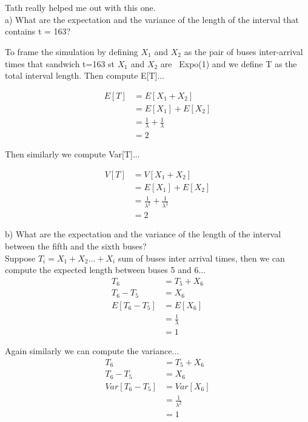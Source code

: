 \documentclass[twocolumn]{article}
\begin{document}
\noindent
{} \\\\
Tath really helped me out with this one.\\

\noindent
\mm a) What are the expectation and the variance of the length of the interval that contains t = 163?\\ \normalfont

To frame the simulation by defining $X_1$ and $X_2$ as the pair of buses inter-arrival times that sandwich t=163 st  $X_1$ and $X_2$ are ~Expo(1) and we define T as the total interval length. Then compute E[T]...

\begin{align*}
	E[T] &= E[X_1 + X_2]\\
		 &= E[X_1] + E[X_2]\\
	     &= \frac{1}{\lambda} + \frac{1}{\lambda}\\
	     &= 2
\end{align*}

Then similarly we compute Var[T]...


\begin{align*}
	V[T] &= V[X_1 + X_2]\\
	&= E[X_1] + E[X_2]\\
	&= \frac{1}{\lambda^2} + \frac{1}{\lambda^2}\\
	&= 2
\end{align*}


\noindent
\mm b)  What are the expectation and the variance of the length of the interval between the fifth and the sixth buses? \normalfont\\

Suppose $T_i = X_1 + X_2 ... + X_i$ sum of buses inter arrival times, then we can compute the expected length between buses 5 and 6...
\begin{align*}
	T_6 &= T_5 + X_6\\
	T_6 - T_5 &= X_6\\	
	E[T_6 - T_5] &= E[X_6]\\
	&= \frac{1}{\lambda}\\
	&= 1	
\end{align*}

Again similarly we can compute the variance...
\begin{align*}
	T_6 &= T_5 + X_6\\
	T_6 - T_5 &= X_6\\	
	Var[T_6 - T_5] &= Var[X_6]\\
	&= \frac{1}{\lambda^2}\\
	&= 1	
\end{align*}
\end{document}

